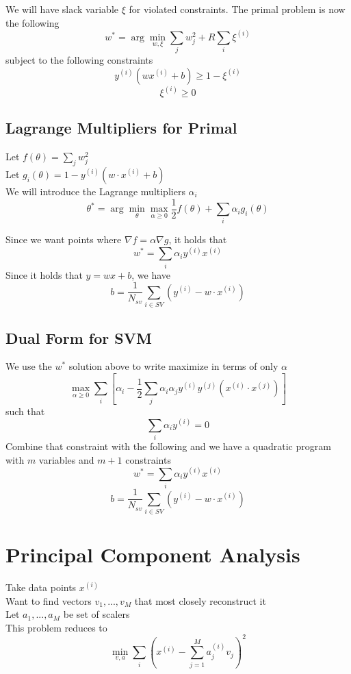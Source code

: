 \documentclass[twoside,11pt]{article}
\theoremstyle{definition}
\begin{document}
We will have slack variable $\xi$ for violated constraints. The primal problem is now the following
\[
w^{*} = \arg \min_{w,\xi} \sum_j w_j^2 + R \sum_i \xi^{(i)}
\]
subject to the following constraints
\[
y^{(i)} (w x^{(i)} + b) \geq 1 - \xi^{(i)}
\]
\[
\xi^{(i)} \geq 0
\]

\subsection{Lagrange Multipliers for Primal}

Let $f(\theta) = \sum_j {w_j^2}$\\
Let $g_i(\theta) = 1-y^{(i)}(w \cdot x^{(i)} + b)$\\
We will introduce the Lagrange multipliers $\alpha_i$\\
\[
\theta^* = \arg \min_{\theta} \max_{\alpha \geq 0} \frac{1}{2} f(\theta) + \sum_i \alpha_i g_i(\theta)
\]

Since we want points where $\nabla f = \alpha \nabla g$, it holds that 
\[
w^* = \sum_i \alpha_i y^{(i)} x^{(i)}
\]
Since it holds that $y=wx+b$, we have
\[
b = \frac{1}{N_{sv}} \sum_{i \in SV} (y^{(i)} - w \cdot x^{(i)})
\]

\subsection{Dual Form for SVM}

We use the $w^*$ solution above to write maximize in terms of only $\alpha$ 
\[
\max_{\alpha \geq 0} \sum_i [\alpha_i - \frac{1}{2} \sum_j \alpha_i \alpha_j y^{(i)} y^{(j)} (x^{(i)} \cdot x^{(j)})]
\]
such that
\[
\sum_i \alpha_i y^{(i)} = 0
\]
Combine that constraint with the following and we have a quadratic program with $m$ variables and $m+1$ constraints 
\[
w^* = \sum_i \alpha_i y^{(i)} x^{(i)}
\]
\[
b = \frac{1}{N_{sv}} \sum_{i \in SV} (y^{(i)} - w \cdot x^{(i)})
\]

\newpage

\section{Principal Component Analysis}

Take data points $x^{(i)}$\\
Want to find vectors $v_1,...,v_M$ that most closely reconstruct it\\
Let $a_1,...,a_M$ be set of scalers\\
This problem reduces to
\[
\min_{v,a} \sum_{i} (x^{(i)} - \sum_{j=1}^M a_j^{(i)}v_j)^2
\]
\end{document}
